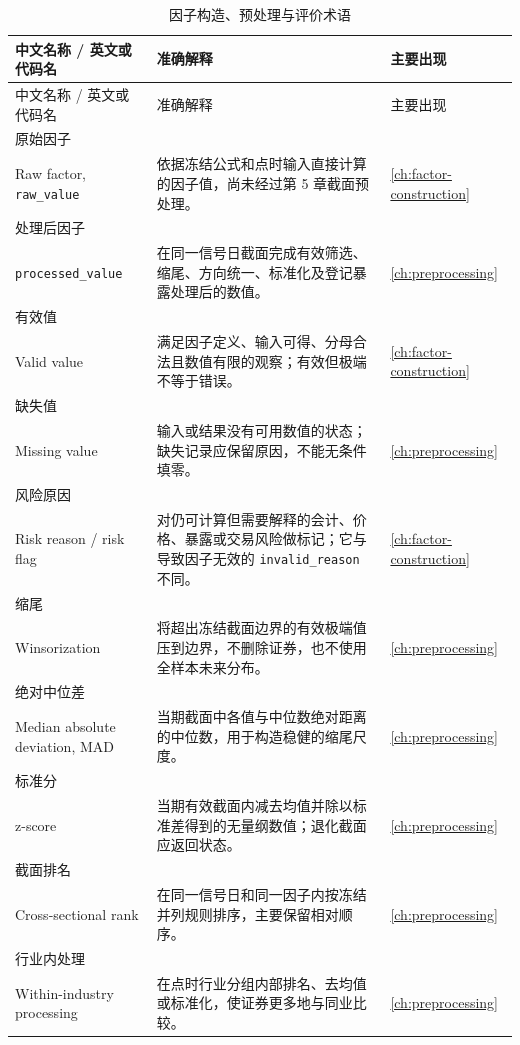 \begingroup
\footnotesize
\setlength{\tabcolsep}{3pt}
\begin{longtable}{@{}p{3.2cm}p{9.0cm}p{2.8cm}@{}}
\caption{因子构造、预处理与评价术语}\label{tab:appA-factor-evaluation-terms}\\
\toprule
中文名称 / 英文或代码名 & 准确解释 & 主要出现 \\
\midrule
\endfirsthead
\toprule
中文名称 / 英文或代码名 & 准确解释 & 主要出现 \\
\midrule
\endhead
原始因子\\Raw factor, \texttt{raw\_value} & 依据冻结公式和点时输入直接计算的因子值，尚未经过第 5 章截面预处理。 & \cref{ch:factor-construction} \\
处理后因子\\\texttt{processed\_value} & 在同一信号日截面完成有效筛选、缩尾、方向统一、标准化及登记暴露处理后的数值。 & \cref{ch:preprocessing} \\
有效值\\Valid value & 满足因子定义、输入可得、分母合法且数值有限的观察；有效但极端不等于错误。 & \cref{ch:factor-construction} \\
缺失值\\Missing value & 输入或结果没有可用数值的状态；缺失记录应保留原因，不能无条件填零。 & \cref{ch:preprocessing} \\
风险原因\\Risk reason / risk flag & 对仍可计算但需要解释的会计、价格、暴露或交易风险做标记；它与导致因子无效的 \texttt{invalid\_reason} 不同。 & \cref{ch:factor-construction} \\
缩尾\\Winsorization & 将超出冻结截面边界的有效极端值压到边界，不删除证券，也不使用全样本未来分布。 & \cref{ch:preprocessing} \\
绝对中位差\\Median absolute deviation, MAD & 当期截面中各值与中位数绝对距离的中位数，用于构造稳健的缩尾尺度。 & \cref{ch:preprocessing} \\
标准分\\z-score & 当期有效截面内减去均值并除以标准差得到的无量纲数值；退化截面应返回状态。 & \cref{ch:preprocessing} \\
截面排名\\Cross-sectional rank & 在同一信号日和同一因子内按冻结并列规则排序，主要保留相对顺序。 & \cref{ch:preprocessing} \\
行业内处理\\Within-industry processing & 在点时行业分组内部排名、去均值或标准化，使证券更多地与同业比较。 & \cref{ch:preprocessing} \\

\end{longtable}

